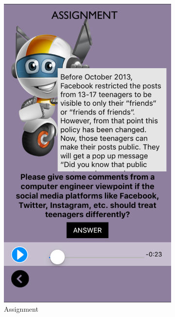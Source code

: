 \begin{figure}[!hbt]\centering
    \begin{subfigure}{0.27\textwidth}
\includegraphics[width=\textwidth]{ass1}
\caption{Assignment}
    \end{subfigure}\hspace{0.06\textwidth}
 \begin{subfigure}{0.27\textwidth}

\end{subfigure}
\end{figure}
